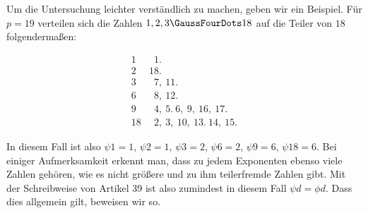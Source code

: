 
Um die Untersuchung leichter verständlich zu machen, geben wir ein Beispiel. Für $p=19$ verteilen sich die Zahlen $1,2,3\GaussFourDots18$ auf die Teiler von $18$ folgendermaßen:

\[
\begin{array}{r|l}
1 & \phantom{1}1.\\
2 & 18.\\
3 & \phantom{1}7,\ 11.\\
6 & \phantom{1}8,\ 12.\\
9 & \phantom{1}4,\ 5.\ 6,\ 9,\ 16,\ 17.\\
18 & \phantom{1}2,\ 3,\ 10,\ 13.\ 14,\ 15.
\end{array}
\]

In diesem Fall ist also $\psi1=1$, $\psi2=1$, $\psi3=2$, $\psi6=2$, $\psi9=6$, $\psi18=6$. Bei einiger Aufmerksamkeit erkennt man, dass zu jedem Exponenten ebenso viele Zahlen gehören, wie es nicht größere und zu ihm teilerfremde Zahlen gibt. Mit der Schreibweise von Artikel 39 ist also zumindest in diesem Fall $\psi d=\phi d$. Dass dies allgemein gilt, beweisen wir so.

